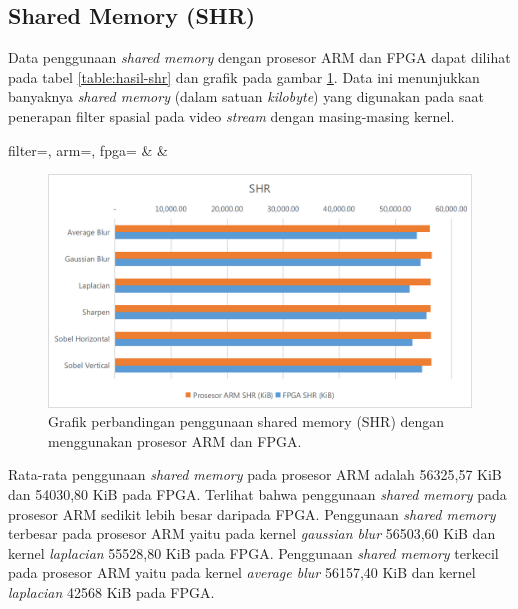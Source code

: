\subsection{Shared Memory (SHR)}
Data penggunaan \textit{shared memory} dengan prosesor ARM dan FPGA dapat dilihat pada tabel \ref{table:hasil-shr} dan grafik pada gambar \ref{fig:chart-shr}. Data ini menunjukkan banyaknya \textit{shared memory} (dalam satuan \textit{kilobyte}) yang digunakan pada saat penerapan filter spasial pada video \textit{stream} dengan masing-masing kernel.
\begin{atable}
    \caption{Tabel perbandingan penggunaan shared memory (SHR) dengan menggunakan prosesor ARM dan FPGA.}
    \label{table:hasil-shr}
        {
            filter=\filter, 
            arm=\arm, 
            fpga=\fpga}
        {
            \filter & 
            \arm & 
            \fpga }
\end{atable}
\begin{figure}[ht]
    \includegraphics[width=0.81\linewidth, center]{images/chart/chart-shr.png}
    \caption{Grafik perbandingan penggunaan shared memory (SHR) dengan menggunakan prosesor ARM dan FPGA.}
    \label{fig:chart-shr}
\end{figure}
Rata-rata penggunaan \textit{shared memory} pada prosesor ARM adalah 56325,57 KiB dan 54030,80 KiB pada FPGA. Terlihat bahwa penggunaan \textit{shared memory} pada prosesor ARM sedikit lebih besar daripada FPGA. Penggunaan \textit{shared memory} terbesar pada prosesor ARM yaitu pada kernel \textit{gaussian blur} 56503,60 KiB dan kernel \textit{laplacian} 55528,80 KiB pada FPGA. Penggunaan \textit{shared memory} terkecil pada prosesor ARM yaitu pada kernel \textit{average blur} 56157,40 KiB dan kernel \textit{laplacian} 42568 KiB pada FPGA.

